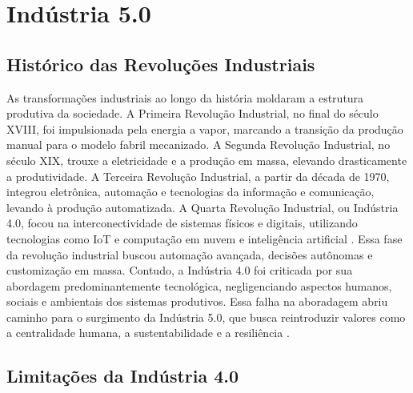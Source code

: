 
\chapter{Indústria 5.0}\label{cap:indutria5_0}
\section{Histórico das Revoluções Industriais}

As transformações industriais ao longo da história moldaram a estrutura produtiva da sociedade.
A Primeira Revolução Industrial, no final do século XVIII, foi impulsionada pela energia a vapor, marcando a transição da produção manual para o modelo fabril mecanizado.
A Segunda Revolução Industrial, no século XIX, trouxe a eletricidade e a produção em massa, elevando drasticamente a produtividade.
A Terceira Revolução Industrial, a partir da década de 1970, integrou eletrônica, automação e tecnologias da informação e comunicação, levando à produção automatizada.
A Quarta Revolução Industrial, ou Indústria 4.0, focou na interconectividade de sistemas físicos e digitais, utilizando tecnologias como \gls{IoT} e computação em nuvem e inteligência artificial \cite{VALETTE2023}.
Essa fase da revolução industrial buscou automação avançada, decisões autônomas e customização em massa.
Contudo, a Indústria 4.0 foi criticada por sua abordagem predominantemente tecnológica, negligenciando aspectos humanos, sociais e ambientais dos sistemas produtivos.
Essa falha na aboradagem abriu caminho para o surgimento da Indústria 5.0, que busca reintroduzir valores como a centralidade humana, a sustentabilidade e a resiliência \cite{Xu2021, PIZON2023}.

\section{Limitações da Indústria 4.0}

